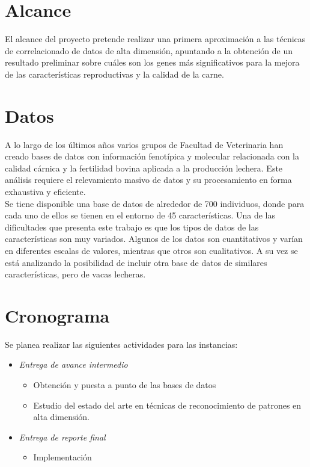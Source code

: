 \documentclass[12pt,a4paper,titlepage]{report}
\begin{document}
\section*{Alcance}

El alcance del proyecto pretende realizar una primera aproximación a las técnicas de correlacionado de datos de alta dimensión, apuntando a la obtención de un resultado preliminar sobre cuáles son los genes más significativos para la mejora de las características reproductivas y la calidad de la carne.

\section*{Datos}
A lo largo de los últimos años varios grupos de Facultad de Veterinaria han creado bases de datos con información fenotípica y molecular relacionada con la calidad cárnica y la fertilidad bovina aplicada a la producción lechera. Este análisis requiere el relevamiento masivo de datos y su procesamiento en forma exhaustiva y eficiente. \\

Se tiene disponible una base de datos de alrededor de 700 individuos, donde para cada uno de ellos se tienen en el entorno de 45 características. Una de las dificultades que presenta este trabajo es que los tipos de datos de las características son muy variados. Algunos de los datos son cuantitativos y varían en diferentes escalas de valores, mientras que otros son cualitativos. A su vez se está analizando la posibilidad de incluir otra base de datos de similares características, pero de vacas lecheras.
\section*{Cronograma}

Se planea realizar las siguientes actividades para las instancias:
\begin{itemize}
	\item \emph{Entrega de avance intermedio}
	\begin{itemize}
		\item Obtención y puesta a punto de las bases de datos
		\item Estudio del estado del arte en técnicas de reconocimiento de patrones en alta dimensión.
	\end{itemize}
	\item \emph{Entrega de reporte final}
	\begin{itemize}
		\item Implementación
	\end{itemize}
\end{itemize}
\end{document}
